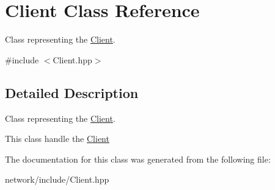 \hypertarget{class_client}{}\section{Client Class Reference}
\label{class_client}


Class representing the \hyperlink{class_client}{Client}.  




{\ttfamily \#include $<$Client.\+hpp$>$}



\subsection{Detailed Description}
Class representing the \hyperlink{class_client}{Client}. 

This class handle the \hyperlink{class_client}{Client} 

The documentation for this class was generated from the following file\+:\begin{DoxyCompactItemize}
\item 
network/include/Client.\+hpp\end{DoxyCompactItemize}
